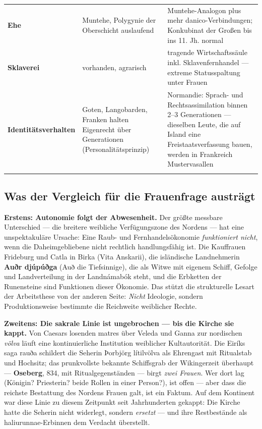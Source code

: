 \documentclass[11pt,a4paper,ngerman]{scrartcl}
\newcommand{\chipbase}[2]{\hspace{0pt}{\footnotesize\textcolor{#1}{[\textsc{#2}]}}}
\newcommand{\chipbelegt}[1]{\chipbase{chipgreen}{#1}}
\newcommand{\chipplausibel}[1]{\chipbase{chipamber}{#1}}
\newcommand{\chipumstritten}[1]{\chipbase{chipred}{#1}}
\begin{document}
\begin{small}
\begin{longtable}{>{\raggedright\arraybackslash}p{}>{\raggedright\arraybackslash}p{}>{\raggedright\arraybackslash}p{}}
\addlinespace[2pt]
\textbf{Ehe} & Muntehe, Polygynie der Oberschicht auslaufend & Muntehe-Analogon plus mehr danico-Verbindungen; Konkubinat der Großen bis ins 11. Jh. normal \\
\addlinespace[2pt]
\textbf{Sklaverei} & vorhanden, agrarisch & tragende Wirtschaftssäule inkl. Sklavenfernhandel — extreme Statusspaltung unter Frauen \\
\addlinespace[2pt]
\textbf{Identitätsverhalten} & Goten, Langobarden, Franken halten Eigenrecht über Generationen (Personalitätsprinzip) & Normandie: Sprach- und Rechtsassimilation binnen 2–3 Generationen — dieselben Leute, die auf Island eine Freistaatsverfassung bauen, werden in Frankreich Mustervasallen \\
\addlinespace[2pt]
\bottomrule
\end{longtable}
\end{small}

\subsection*{Was der Vergleich für die Frauenfrage austrägt}

\textbf{Erstens: Autonomie folgt der Abwesenheit.} Der größte messbare Unterschied — die breitere weibliche Verfügungszone des Nordens — hat eine unspektakuläre Ursache: Eine Raub- und Fernhandelsökonomie \emph{funktioniert nicht}, wenn die Daheimgebliebene nicht rechtlich handlungsfähig ist. Die Kauffrauen Frideburg und Catla in Birka (Vita Anskarii), die isländische Landnehmerin \textbf{Auðr djúpúðga} (Auð die Tiefsinnige), die als Witwe mit eigenem Schiff, Gefolge und Landverteilung in der Landnámabók steht, und die Erbketten der Runensteine sind Funktionen dieser Ökonomie. Das stützt die strukturelle Lesart der Arbeitsthese von der anderen Seite: \emph{Nicht} Ideologie, sondern Produktionsweise bestimmte die Reichweite weiblicher Rechte. \chipplausibel{plausibel}

\textbf{Zweitens: Die sakrale Linie ist ungebrochen — bis die Kirche sie kappt.} Von Caesars losenden matres über Veleda und Ganna zur nordischen \emph{völva} läuft eine kontinuierliche Institution weiblicher Kultautorität. Die Eiríks saga rauða schildert die Seherin Þorbjörg lítilvölva als Ehrengast mit Ritualstab und Hochsitz; das prunkvollste bekannte Schiffsgrab der Wikingerzeit überhaupt — \textbf{Oseberg}, 834, mit Ritualgegenständen — birgt \emph{zwei Frauen}. Wer dort lag (Königin? Priesterin? beide Rollen in einer Person?), ist offen \chipumstritten{umstritten} — aber dass die reichste Bestattung des Nordens Frauen galt, ist ein Faktum. \chipbelegt{belegt} Auf dem Kontinent war diese Linie zu diesem Zeitpunkt seit Jahrhunderten gekappt: Die Kirche hatte die Seherin nicht widerlegt, sondern \emph{ersetzt} — und ihre Restbestände als haliurunnae-Erbinnen dem Verdacht überstellt.
\end{document}

